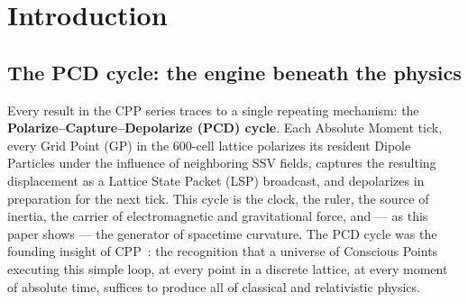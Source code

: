 \documentclass[12pt]{article}
\newcommand{\lP}{l_P}
\newcommand{\SSV}{\text{SSV}}
\newcommand{\PSR}{\text{PSR}}
\begin{document}
\begin{abstract}
We extend the weak-field GR results of companion~7 to the full
nonlinear regime.  The PSR formula
$\PSR_{\rm eff}(r) = \lP/(1 + k\,\Delta|\SSV|(r))$,
combined with the shell-broadcast source equation
$k\,\Delta|\SSV| = GM/rc^2$ (exact, from the Newtonian Gravity
companion), yields the Schwarzschild metric in isotropic coordinates
without approximation (Theorem~\ref{thm:schwarzschild}).
Standard Schwarzschild follows by coordinate transformation.
The CPP field equation governing the self-consistent LSP distribution
is identified as a nonlinear wave equation for $\Delta\SSV$ that
reduces to the linearised Einstein equations in the weak-field limit
(Proposition~\ref{prop:field_eq}).
The CP Exclusion Rule imposes a minimum lattice spacing
$\PSR_{\rm eff} \geq \lP/2$, preventing the metric from reaching zero
at $r = 0$ and replacing the GR singularity with a Planck-density core
(Theorem~\ref{thm:core}).
Additional predictions include a Planck remnant from Hawking evaporation,
suppressed scalar/vector gravitational wave modes, and a qualitative
derivation of the Kerr frame-dragging term from the angular SSV curl.
No new postulates are introduced beyond those of Version~16.
\end{abstract}

\section{Introduction}
\label{sec:intro}

\subsection*{The PCD cycle: the engine beneath the physics}

Every result in the CPP series traces to a single repeating mechanism:
the \textbf{Polarize--Capture--Depolarize (PCD) cycle}.  Each Absolute
Moment tick, every Grid Point (GP) in the 600-cell lattice polarizes
its resident Dipole Particles under the influence of neighboring SSV
fields, captures the resulting displacement as a Lattice State Packet
(LSP) broadcast, and depolarizes in preparation for the next tick.
This cycle is the clock, the ruler, the source of inertia, the
carrier of electromagnetic and gravitational force, and --- as this
paper shows --- the generator of spacetime curvature.  The PCD cycle
was the founding insight of CPP~\cite{v16}: the recognition that a
universe of Conscious Points executing this simple loop, at every point
in a discrete lattice, at every moment of absolute time, suffices to
produce all of classical and relativistic physics.
\end{document}
